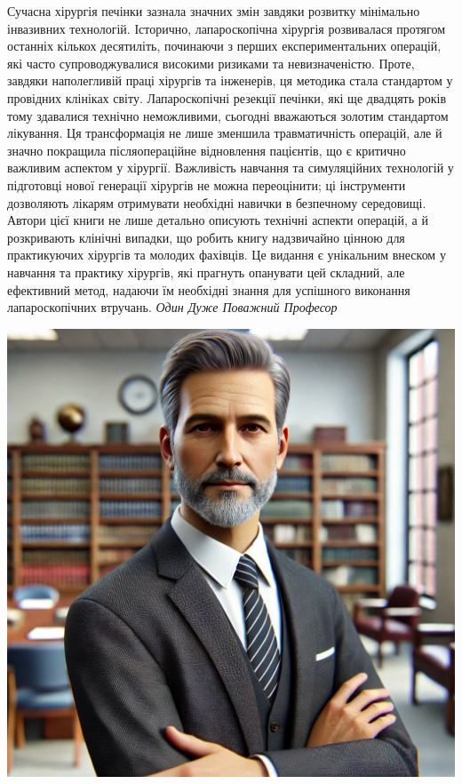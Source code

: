 \newpage

\noindent
\begin{minipage}{0.65\textwidth}
Сучасна хірургія печінки зазнала значних змін завдяки розвитку мінімально інвазивних технологій. Історично, лапароскопічна хірургія розвивалася протягом останніх кількох десятиліть, починаючи з перших експериментальних операцій, які часто супроводжувалися високими ризиками та невизначеністю. Проте, завдяки наполегливій праці хірургів та інженерів, ця методика стала стандартом у провідних клініках світу. Лапароскопічні резекції печінки, які ще двадцять років тому здавалися технічно неможливими, сьогодні вважаються золотим стандартом лікування. Ця трансформація не лише зменшила травматичність операцій, але й значно покращила післяопераційне відновлення пацієнтів, що є критично важливим аспектом у хірургії. Важливість навчання та симуляційних технологій у підготовці нової генерації хірургів не можна переоцінити; ці інструменти дозволяють лікарям отримувати необхідні навички в безпечному середовищі. Автори цієї книги не лише детально описують технічні аспекти операцій, а й розкривають клінічні випадки, що робить книгу надзвичайно цінною для практикуючих хірургів та молодих фахівців. Це видання є унікальним внеском у навчання та практику хірургів, які прагнуть опанувати цей складний, але ефективний метод, надаючи їм необхідні знання для успішного виконання лапароскопічних втручань.  
\vspace{30pt} 
\vfill   
\hfill \textit{Один Дуже Поважний Професор}
\vfill  
\end{minipage}
\hfill
\begin{minipage}{0.3\textwidth}
    \centering
    \includegraphics[width=\textwidth]{Illustrations/Preface/image1.png}
\end{minipage}

